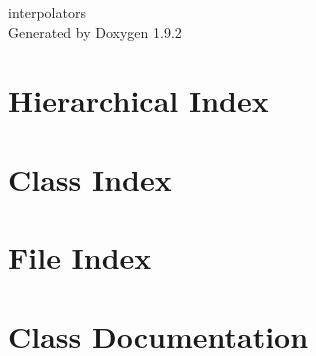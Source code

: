 \documentclass[twoside]{book}
\newcommand{\+}{\discretionary{\mbox{\scriptsize$\hookleftarrow$}}{}{}}
\newcommand{\clearemptydoublepage}{%
    \newpage{\pagestyle{empty}\cleardoublepage}%
  }
\begin{document}
  \raggedbottom
    \hypersetup{pageanchor=false,
                bookmarksnumbered=true,
                pdfencoding=unicode
               }
  \begin{titlepage}
  \vspace*{7cm}
  \begin{center}%
  {\Large interpolators}\\
  \vspace*{1cm}
  {\large Generated by Doxygen 1.9.2}\\
  \end{center}
  \end{titlepage}
  \clearemptydoublepage
  \tableofcontents
  \clearemptydoublepage
  \hypersetup{pageanchor=true}
\chapter{Hierarchical Index}

\chapter{Class Index}

\chapter{File Index}

\chapter{Class Documentation}














\end{document}
